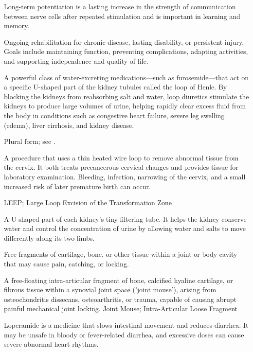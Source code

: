  Long-term potentiation is a lasting increase in the strength of communication between nerve cells after repeated stimulation and is important in learning and memory.

 Ongoing rehabilitation for chronic disease, lasting disability, or persistent injury. Goals include maintaining function, preventing complications, adapting activities, and supporting independence and quality of life.

 A powerful class of water-excreting medications---such as furosemide---that act on a specific U-shaped part of the kidney tubules called the loop of Henle. By blocking the kidneys from reabsorbing salt and water, loop diuretics stimulate the kidneys to produce large volumes of urine, helping rapidly clear excess fluid from the body in conditions such as congestive heart failure, severe leg swelling (edema), liver cirrhosis, and kidney disease.

 Plural form; see .

 A procedure that uses a thin heated wire loop to remove abnormal tissue from the cervix. It both treats precancerous cervical changes and provides tissue for laboratory examination. Bleeding, infection, narrowing of the cervix, and a small increased risk of later premature birth can occur.

\synonyms
LEEP; Large Loop Excision of the Transformation Zone

 A U-shaped part of each kidney’s tiny filtering tube. It helps the kidney conserve water and control the concentration of urine by allowing water and salts to move differently along its two limbs.

 Free fragments of cartilage, bone, or other tissue within a joint or body cavity that may cause pain, catching, or locking.

 A free-floating intra-articular fragment of bone, calcified hyaline cartilage, or fibrous tissue within a synovial joint space ('joint mouse'), arising from osteochondritis dissecans, osteoarthritis, or trauma, capable of causing abrupt painful mechanical joint locking.
\synonyms
Joint Mouse; Intra-Articular Loose Fragment

 Loperamide is a medicine that slows intestinal movement and reduces diarrhea. It may be unsafe in bloody or fever-related diarrhea, and excessive doses can cause severe abnormal heart rhythms.


